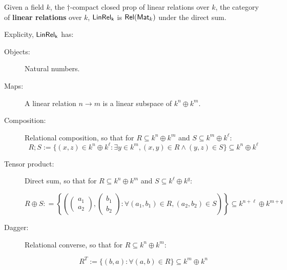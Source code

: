 \begin{definition}
Given a field $k$, the $\dag$-compact closed prop of linear relations over $k$, the category of {\bf linear relations} over $k$, $\sf LinRel_{k}$ is $\mathsf{Rel}(\mathsf{Mat}_k)$ under the direct sum.

Explicity, $\sf LinRel_{k}$ has:

\begin{description}
\item[Objects:] Natural numbers.

\item[Maps:] A linear relation $n\to m$ is a linear subspace of $k^n \oplus k^m$.

\item[Composition:] Relational composition, so that for $R \subseteq k^n \oplus k^m$  and $S \subseteq k^m \oplus k^\ell$:
$$
R;S := \{  (x,z) \in k^{n} \oplus k^{\ell} : \exists y \in k^{m}, (x,y) \in R \wedge (y,z) \in S \} \subseteq k^n \oplus k^\ell
$$ 

\item[Tensor product:] Direct sum, so that for $R \subseteq k^n \oplus k^m$ and $S \subseteq k^\ell \oplus k^q$:

$$R\oplus S : =
\left\{
\left(
\begin{pmatrix}
a_1\\a_2
\end{pmatrix},
\begin{pmatrix}
b_1\\b_2
\end{pmatrix}
:
\forall (a_1,b_1) \in R, (a_2,b_2) \in S
\right)
\right\} \subseteq k^{n+\ell}\oplus k^{m+q}
$$

\item[Dagger:] Relational converse, so that for $R \subseteq k^{n}\oplus k^m$:

$$
R^T := \{ (b,a) : \forall (a,b) \in R \} \subseteq k^{m} \oplus k^n
$$
\end{description}
\end{definition}




